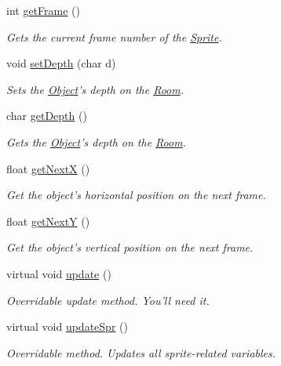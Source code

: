 \begin{DoxyCompactItemize}
int \hyperlink{class_object_a2a1724269f3d7ebf7007d079312cb850}{get\-Frame} ()
\begin{DoxyCompactList}\small\item\em Gets the current frame number of the \hyperlink{class_sprite}{Sprite}. \end{DoxyCompactList}\item 
void \hyperlink{class_object_a7d97667046ee84c23f4f362892bf4e33}{set\-Depth} (char d)
\begin{DoxyCompactList}\small\item\em Sets the \hyperlink{class_object}{Object}'s depth on the \hyperlink{class_room}{Room}. \end{DoxyCompactList}\item 
char \hyperlink{class_object_aad6045382d08dc0bf4fc8a35915560ea}{get\-Depth} ()
\begin{DoxyCompactList}\small\item\em Gets the \hyperlink{class_object}{Object}'s depth on the \hyperlink{class_room}{Room}. \end{DoxyCompactList}\item 
float \hyperlink{class_object_a9397ff68bd3fdba963dfb054ea5e62c1}{get\-Next\-X} ()
\begin{DoxyCompactList}\small\item\em Get the object's horizontal position on the next frame. \end{DoxyCompactList}\item 
float \hyperlink{class_object_afda996a7119562f31a67e85029567ba7}{get\-Next\-Y} ()
\begin{DoxyCompactList}\small\item\em Get the object's vertical position on the next frame. \end{DoxyCompactList}\item 
virtual void \hyperlink{class_object_a4abd48bacb1b004c8ac891597c831f77}{update} ()
\begin{DoxyCompactList}\small\item\em Overridable update method. You'll need it. \end{DoxyCompactList}\item 
virtual void \hyperlink{class_object_af4c1bcbca9ad6bf7c11e573f16fec895}{update\-Spr} ()
\begin{DoxyCompactList}\small\item\em Overridable method. Updates all sprite-\/related variables. \end{DoxyCompactList}\end{DoxyCompactItemize}
